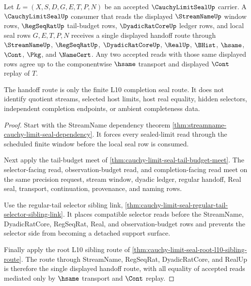 \begin{theorem}
\label{thm:cauchy-limit-seal-tail-budget-handoff-determinacy}
Let $L=(X,S,D,G,E,T,P,N)$ be an accepted $\CauchyLimitSealUp$ carrier. A $\CauchyLimitSealUp$ consumer that reads the displayed $\StreamNameUp$ window rows, $\RegSeqRatUp$ tail-budget rows, $\DyadicRatCoreUp$ ledger rows, and local seal rows $G,E,T,P,N$ receives a single displayed handoff route through $\StreamNameUp$, $\RegSeqRatUp$, $\DyadicRatCoreUp$, $\RealUp$, $\BHist$, $\hsame$, $\Cont$, $\Pkg$, and $\NameCert$. Any two accepted reads with those same displayed rows agree up to the componentwise $\hsame$ transport and displayed $\Cont$ replay of $T$.

The handoff route is only the finite L10 completion seal route. It does not identify quotient streams, selected host limits, host real equality, hidden selectors, independent completion endpoints, or ambient completeness data.
\end{theorem}
\begin{proof}
Start with the StreamName dependency theorem \autoref{thm:streamname-cauchy-limit-seal-dependency}. It forces every sealed-limit read through the scheduled finite window before the local seal row is consumed.

Next apply the tail-budget meet of \autoref{thm:cauchy-limit-seal-tail-budget-meet}. The selector-facing read, observation-budget read, and completion-facing read meet on the same precision request, stream window, dyadic ledger, regular handoff, Real seal, transport, continuation, provenance, and naming rows.

Use the regular-tail selector sibling link, \autoref{thm:cauchy-limit-seal-regular-tail-selector-sibling-link}. It places compatible selector reads before the StreamName, DyadicRatCore, RegSeqRat, Real, and observation-budget rows and prevents the selector side from becoming a detached support surface.

Finally apply the root L10 sibling route of \autoref{thm:cauchy-limit-seal-root-l10-sibling-route}. The route through StreamName, RegSeqRat, DyadicRatCore, and RealUp is therefore the single displayed handoff route, with all equality of accepted reads mediated only by $\hsame$ transport and $\Cont$ replay.
\end{proof}

